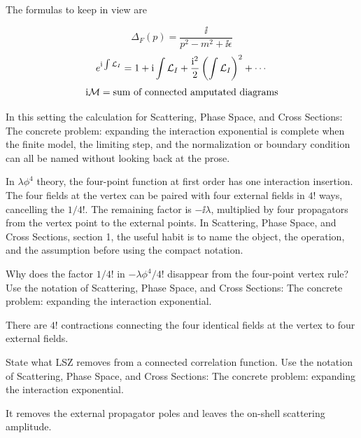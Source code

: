 The formulas to keep in view are

\[
  \Delta_F(p)=\frac{\ii}{p^2-m^2+\ii\epsilon}
\]
\[
  e^{\mathrm i\int\mathcal L_I}=1+\mathrm i\int\mathcal L_I+\frac{\mathrm i^2}{2}\left(\int\mathcal L_I\right)^2+\cdots
\]
\[
  \mathrm i\mathcal M=\hbox{sum of connected amputated diagrams}
\]

In this setting the calculation for Scattering, Phase Space, and Cross Sections: The concrete problem: expanding the interaction exponential is complete when the finite model, the limiting step, and the normalization or boundary condition can all be named without looking back at the prose.




\begin{example}
In \(\lambda\phi^4\) theory, the four-point function at first order has one interaction insertion.  The four fields at the vertex can be paired with four external fields in \(4!\) ways, cancelling the \(1/4!\).  The remaining factor is \(-\ii\lambda\), multiplied by four propagators from the vertex point to the external points.  In Scattering, Phase Space, and Cross Sections, section 1, the useful habit is to name the object, the operation, and the assumption before using the compact notation.
\end{example}



\begin{exercise}
Why does the factor \(1/4!\) in \(-\lambda\phi^4/4!\) disappear from the four-point vertex rule?  Use the notation of Scattering, Phase Space, and Cross Sections: The concrete problem: expanding the interaction exponential.
\begin{answer}
There are \(4!\) contractions connecting the four identical fields at the vertex to four external fields.
\end{answer}
\end{exercise}

\begin{exercise}
State what LSZ removes from a connected correlation function.  Use the notation of Scattering, Phase Space, and Cross Sections: The concrete problem: expanding the interaction exponential.
\begin{answer}
It removes the external propagator poles and leaves the on-shell scattering amplitude.
\end{answer}
\end{exercise}




